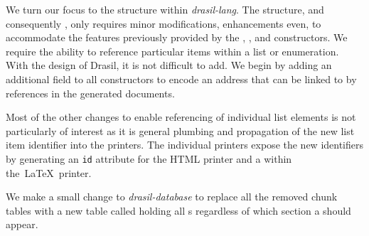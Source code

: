 We turn our focus to the  structure within \textit{drasil-lang}. The  structure, and consequently , only requires minor modifications, enhancements even, to accommodate the features previously provided by the , , and  constructors. We require the ability to reference particular items within a list or enumeration. With the design of Drasil, it is not difficult to add. We begin by adding an additional field to all  constructors to encode an address that can be linked to by references in the generated documents.

%
%         
%
%
%
%

Most of the other changes to enable referencing of individual list elements is not particularly of interest as it is general plumbing and propagation of the new list item identifier into the printers. The individual printers expose the new identifiers by generating an \texttt{id} attribute for the HTML printer and a \texttt{\label{}} within the\ \LaTeX\ printer. 

We make a small change to \textit{drasil-database} to replace all the removed chunk tables with a new table called  holding all s regardless of which section a  should appear.

